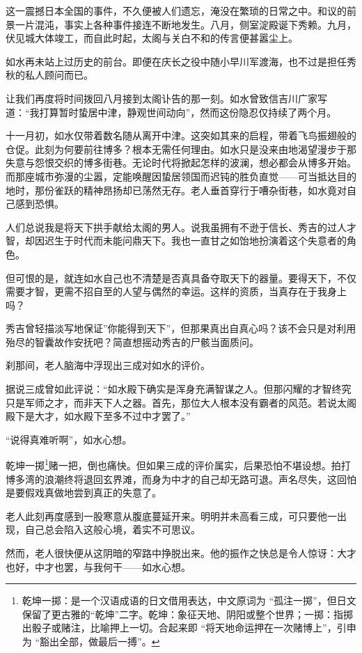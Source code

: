 \documentclass[
]{book}
\begin{document}
这一震撼日本全国的事件，不久便被人们遗忘，淹没在繁琐的日常之中。和议的前景一片混沌，事实上各种事件接连不断地发生。八月，侧室淀殿诞下秀赖。九月，伏见城大体竣工，而自此时起，太阁与关白不和的传言便甚嚣尘上。

如水再未站上过历史的前台。即便在庆长之役中随小早川军渡海，也不过是担任秀秋的私人顾问而已。

让我们再度将时间拨回八月接到太阁讣告的那一刻。如水曾致信吉川广家写道：``我打算暂时蛰居中津，静观世间动向''，然而这份隐忍仅持续了两个月。

十一月初，如水仅带着数名随从离开中津。这突如其来的启程，带着飞鸟振翅般的仓促。此刻为何要前往博多？根本无需任何理由。如水只是没来由地渴望漫步于那失意与怨恨交织的博多街巷。无论时代将掀起怎样的波澜，想必都会从博多开始。而那座城市弥漫的尘嚣，定能唤醒因蛰居领国而迟钝的胜负直觉------可当抵达目的地时，那份雀跃的精神昂扬却已荡然无存。老人垂首穿行于嘈杂街巷，如水竟对自己感到恐惧。

人们总说我是将天下拱手献给太阁的男人。说我虽拥有不逊于信长、秀吉的过人才智，却因迟生于时代而未能问鼎天下。我也一直甘之如饴地扮演着这个失意者的角色。

但可恨的是，就连如水自己也不清楚是否真具备夺取天下的器量。要得天下，不仅需要才智，更需不招自至的人望与偶然的幸运。这样的资质，当真存在于我身上吗？

秀吉曾轻描淡写地保证''你能得到天下''，但那果真出自真心吗？该不会只是对利用殆尽的智囊故作安抚吧？简直想摇动秀吉的尸骸当面质问。

刹那间，老人脑海中浮现出三成对如水的评价。

据说三成曾如此评说：``如水殿下确实是浑身充满智谋之人。但那闪耀的才智终究只是军师之才，而非天下人之器。首先，那位大人根本没有霸者的风范。若说太阁殿下是大才，如水殿下至多不过中才罢了。''

``说得真难听啊''，如水心想。

乾坤一掷\footnote{乾坤一掷：是一个汉语成语的日文借用表达，中文原词为 ``孤注一掷''，但日文保留了更古雅的``乾坤''二字。乾坤：象征天地、阴阳或整个世界；一掷：指掷出骰子或赌注，比喻押上一切。合起来即 ``将天地命运押在一次赌博上''，引申为 ``豁出全部，做最后一搏''。}赌一把，倒也痛快。但如果三成的评价属实，后果恐怕不堪设想。拍打博多湾的浪潮终将退回玄界滩，而身为中才的自己却无路可退。声名尽失，这回怕是要假戏真做地尝到真正的失意了。

老人此刻再度感到一股寒意从腹底蔓延开来。明明并未高看三成，可只要他一出现，自己总会陷入这般心境，着实不可思议。

然而，老人很快便从这阴暗的窄路中挣脱出来。他的振作之快总是令人惊讶：大才也好，中才也罢，与我何干------如水心想。
\end{document}
